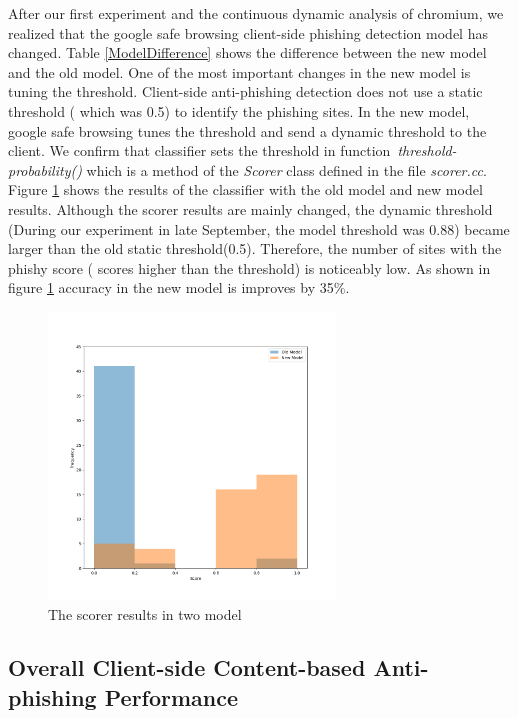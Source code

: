 After our first experiment and the continuous dynamic analysis of chromium, we realized that the google safe browsing client-side phishing detection model has changed. 
Table \ref{ModelDifference} shows the difference between the new model and the old model. One of the most important changes in the new model is tuning the threshold.
Client-side anti-phishing detection does not use a static threshold ( which was 0.5) to identify the phishing sites. In the new model, google safe browsing tunes the threshold and send a dynamic threshold to the client. 
We confirm that classifier sets the threshold in function~\textit{threshold-probability()} which is a method of the \textit{Scorer} class defined in the file \textit{scorer.cc}. 
Figure \ref{fig:two model} shows the results of the classifier with the old model and new model results. Although the scorer results are mainly changed, the dynamic threshold (During our experiment in late September, the model threshold was 0.88) became larger than the old static threshold(0.5). Therefore, the number of sites with the phishy score ( scores higher than the threshold) is noticeably low.
As shown in figure \ref{fig:two model} accuracy in the new model is improves by 35\%. 

 \begin{figure}
\centering
\includegraphics[height=3in, width=3in]{figures/Histogram.png}
\caption{The scorer results in two model }
\label{fig:two model}
\end{figure} 

\subsection{Overall Client-side Content-based Anti-phishing Performance}

